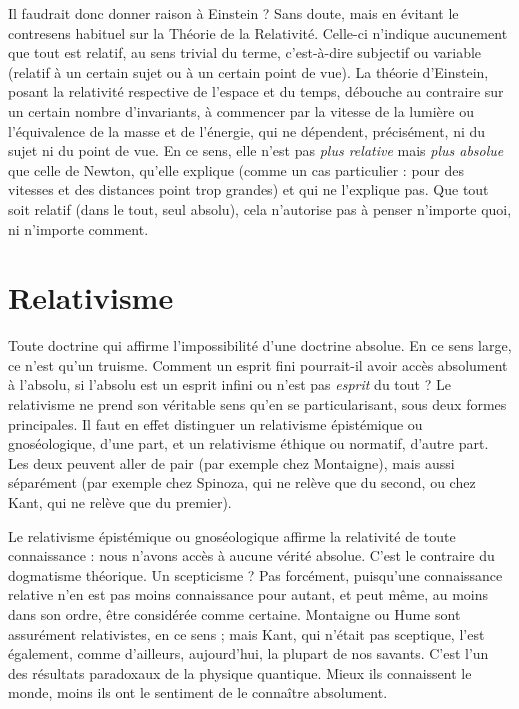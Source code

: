 Il faudrait donc donner raison à Einstein ? Sans doute, mais en évitant le
contresens habituel sur la Théorie de la Relativité. Celle-ci n’indique aucunement
que tout est relatif, au sens trivial du terme, c’est-à-dire subjectif ou
variable (relatif à un certain sujet ou à un certain point de vue). La théorie
d’Einstein, posant la relativité respective de l’espace et du temps, débouche au
contraire sur un certain nombre d’invariants, à commencer par la vitesse de la
lumière ou l’équivalence de la masse et de l'énergie, qui ne dépendent, précisément,
ni du sujet ni du point de vue. En ce sens, elle n’est pas {\it plus relative} mais
{\it plus absolue} que celle de Newton, qu’elle explique (comme un cas particulier :
pour des vitesses et des distances point trop grandes) et qui ne l'explique pas.
Que tout soit relatif (dans le tout, seul absolu), cela n'autorise pas à penser
n'importe quoi, ni n'importe comment.

\section{Relativisme}
Toute doctrine qui affirme l'impossibilité d’une doctrine
absolue. En ce sens large, ce n’est qu’un truisme. Comment
un esprit fini pourrait-il avoir accès absolument à l’absolu, si l'absolu est un
esprit infini ou n’est pas {\it esprit} du tout ? Le relativisme ne prend son véritable
sens qu’en se particularisant, sous deux formes principales. Il faut en effet distinguer
un relativisme épistémique ou gnoséologique, d’une part, et un relativisme
éthique ou normatif, d’autre part. Les deux peuvent aller de pair (par
exemple chez Montaigne), mais aussi séparément (par exemple chez Spinoza,
qui ne relève que du second, ou chez Kant, qui ne relève que du premier).

Le relativisme épistémique ou gnoséologique affirme la relativité de toute
connaissance : nous n’avons accès à aucune vérité absolue. C’est le contraire du
dogmatisme théorique. Un scepticisme ? Pas forcément, puisqu’une connaissance
relative n’en est pas moins connaissance pour autant, et peut même, au
moins dans son ordre, être considérée comme certaine. Montaigne ou Hume
sont assurément relativistes, en ce sens ; mais Kant, qui n'était pas sceptique,
l’est également, comme d’ailleurs, aujourd’hui, la plupart de nos savants. C’est
l’un des résultats paradoxaux de la physique quantique. Mieux ils connaissent
le monde, moins ils ont le sentiment de le connaître absolument.

